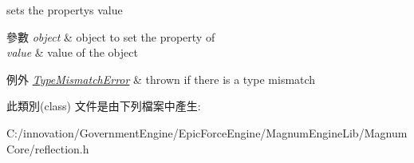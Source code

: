 sets the property\textquotesingle{}s value 


\begin{DoxyParams}{參數}
{\em object} & object to set the property of \\
\hline
{\em value} & value of the object \\
\hline
\end{DoxyParams}

\begin{DoxyExceptions}{例外}
{\em \hyperlink{classagm_1_1reflection_1_1_type_mismatch_error}{Type\+Mismatch\+Error}} & thrown if there is a type mismatch \\
\hline
\end{DoxyExceptions}


此類別(class) 文件是由下列檔案中產生\+:\begin{DoxyCompactItemize}
\item 
C\+:/innovation/\+Government\+Engine/\+Epic\+Force\+Engine/\+Magnum\+Engine\+Lib/\+Magnum\+Core/reflection.\+h\end{DoxyCompactItemize}
